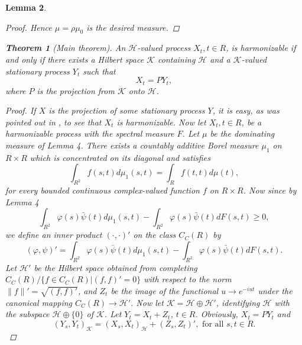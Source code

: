 \documentclass{article}
\newtheorem{theorem}{Theorem}
\newtheorem{lemma}[theorem]{Lemma}
\begin{document}
\begin{lemma}
\begin{enumerate}
\begin{proof}
Hence $\mu = \rho \mu_0$ is the desired measure.
\end{proof}

\begin{theorem}[Main theorem]
An $\mathscr{H}$-valued process $X_t, t \in R$, is harmonizable if and only if there exists a Hilbert space $\mathscr{K}$ containing $\mathscr{H}$ and a $\mathscr{K}$-valued stationary process $Y_t$ such that
\begin{equation}
X_t = PY_t,
\end{equation}
where $P$ is the projection from $\mathscr{K}$ onto $\mathscr{H}$.
\end{theorem}

\begin{proof}
If $X$ is the projection of some stationary process $Y$, it is easy, as was pointed out in \cite{rozanov}, to see that $X_t$ is harmonizable. Now let $X_t, t \in R$, be a harmonizable process with the spectral measure $F$. Let $\mu$ be the dominating measure of Lemma 4. There exists a countably additive Borel measure $\mu_1$ on $R \times R$ which is concentrated on its diagonal and satisfies
\begin{equation}
\int_{R^2} f(s, t) d\mu_1(s, t) = \int_{R} f(t, t) d\mu(t),
\end{equation}
for every bounded continuous complex-valued function $f$ on $R \times R$. Now since by Lemma 4
\begin{equation}
\int_{R^2} \varphi(s) \bar{\psi}(t) d\mu_1(s, t) - \int_{R^2} \varphi(s) \bar{\psi}(t) dF(s, t) \geq 0,
\end{equation}
we define an inner product $(\cdot, \cdot)'$ on the class $C_C(R)$ by
\begin{equation}
(\varphi, \psi)' = \int_{R^2} \varphi(s) \bar{\psi}(t) d\mu_1(s, t) - \int_{R^2} \varphi(s) \bar{\psi}(t) dF(s, t).
\end{equation}
Let $\mathscr{H}'$ be the Hilbert space obtained from completing $C_C(R)/\{f \in C_C(R)|(f, f)' = 0\}$ with respect to the norm $\|f\|' = \sqrt{(f, f)'}$, and $Z_t$ be the image of the functional $u \to e^{-iut}$ under the canonical mapping $C_C(R) \to \mathscr{H}'$. Now let $\mathscr{K} = \mathscr{H} \oplus \mathscr{H}'$, identifying $\mathscr{H}$ with the subspace $\mathscr{H}\oplus \{0\}$ of $\mathscr{K}$. Let $Y_t = X_t + Z_t$, $t\in R$. Obviously, $X_t = PY_t$ and
\begin{equation}
(Y_s, Y_t)_{\mathscr{K}} = (X_s, X_t)_{\mathscr{H}} + (Z_s, Z_t)', \text{ for all } s, t \in R.
\end{equation}


\end{proof}
\end{enumerate}
\end{lemma}
\end{document}
